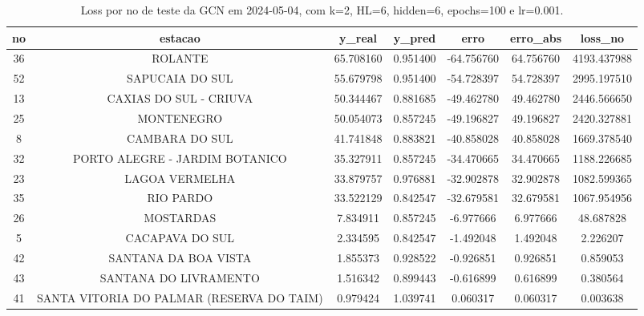 \begin{table}[h]
\centering
\caption{Loss por no de teste da GCN em 2024-05-04, com k=2, HL=6, hidden=6, epochs=100 e lr=0.001.}
\label{tab:gcn_loss_k2_hl6_h6_e100_d20240504}
\begin{tabular}{ccccccc}
\toprule
no & estacao & y\_real & y\_pred & erro & erro\_abs & loss\_no \\
\midrule
36 & ROLANTE & 65.708160 & 0.951400 & -64.756760 & 64.756760 & 4193.437988 \\
52 & SAPUCAIA DO SUL & 55.679798 & 0.951400 & -54.728397 & 54.728397 & 2995.197510 \\
13 & CAXIAS DO SUL - CRIUVA & 50.344467 & 0.881685 & -49.462780 & 49.462780 & 2446.566650 \\
25 & MONTENEGRO & 50.054073 & 0.857245 & -49.196827 & 49.196827 & 2420.327881 \\
8 & CAMBARA DO SUL & 41.741848 & 0.883821 & -40.858028 & 40.858028 & 1669.378540 \\
32 & PORTO ALEGRE - JARDIM BOTANICO & 35.327911 & 0.857245 & -34.470665 & 34.470665 & 1188.226685 \\
23 & LAGOA VERMELHA & 33.879757 & 0.976881 & -32.902878 & 32.902878 & 1082.599365 \\
35 & RIO PARDO & 33.522129 & 0.842547 & -32.679581 & 32.679581 & 1067.954956 \\
26 & MOSTARDAS & 7.834911 & 0.857245 & -6.977666 & 6.977666 & 48.687828 \\
5 & CACAPAVA DO SUL & 2.334595 & 0.842547 & -1.492048 & 1.492048 & 2.226207 \\
42 & SANTANA DA BOA VISTA & 1.855373 & 0.928522 & -0.926851 & 0.926851 & 0.859053 \\
43 & SANTANA DO LIVRAMENTO & 1.516342 & 0.899443 & -0.616899 & 0.616899 & 0.380564 \\
41 & SANTA VITORIA DO PALMAR (RESERVA DO TAIM) & 0.979424 & 1.039741 & 0.060317 & 0.060317 & 0.003638 \\
\bottomrule
\end{tabular}
\end{table}
